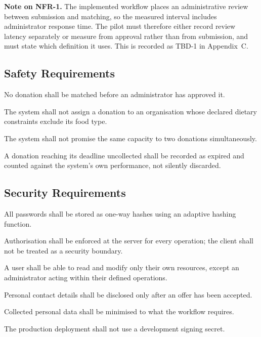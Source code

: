 \documentclass[11pt,a4paper]{article}
\newcommand{\req}[2]{\item[\textbf{#1}] #2}
\begin{document}
\noindent\textbf{Note on NFR-1.} The implemented workflow places an
administrative review between submission and matching, so the measured interval
includes administrator response time. The pilot must therefore either record
review latency separately or measure from approval rather than from submission,
and must state which definition it uses. This is recorded as TBD-1 in
Appendix~C.

\subsection{Safety Requirements}
\begin{description}[leftmargin=1.9cm,style=nextline,font=\normalfont\bfseries]
  \req{NFR-6}{No donation shall be matched before an administrator has approved
    it.}
  \req{NFR-7}{The system shall not assign a donation to an organisation whose
    declared dietary constraints exclude its food type.}
  \req{NFR-8}{The system shall not promise the same capacity to two donations
    simultaneously.}
  \req{NFR-9}{A donation reaching its deadline uncollected shall be recorded as
    expired and counted against the system's own performance, not silently
    discarded.}
\end{description}

\subsection{Security Requirements}
\begin{description}[leftmargin=1.9cm,style=nextline,font=\normalfont\bfseries]
  \req{NFR-10}{All passwords shall be stored as one-way hashes using an adaptive
    hashing function.}
  \req{NFR-11}{Authorisation shall be enforced at the server for every
    operation; the client shall not be treated as a security boundary.}
  \req{NFR-12}{A user shall be able to read and modify only their own resources,
    except an administrator acting within their defined operations.}
  \req{NFR-13}{Personal contact details shall be disclosed only after an offer
    has been accepted.}
  \req{NFR-14}{Collected personal data shall be minimised to what the workflow
    requires.}
  \req{NFR-15}{The production deployment shall not use a development signing
    secret.}
\end{description}
\end{document}
